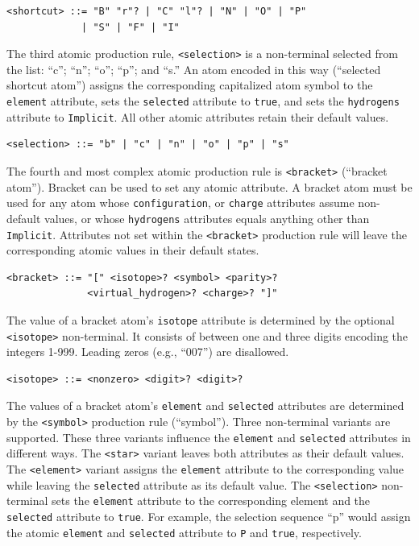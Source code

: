 \documentclass{article}
\def\ttt{\texttt}
\begin{document}
\begin{lstlisting}
<shortcut> ::= "B" "r"? | "C" "l"? | "N" | "O" | "P"
             | "S" | "F" | "I"
\end{lstlisting}

The third atomic production rule, \ttt{<selection>} is a non-terminal selected from the list: \enquote{c}; \enquote{n}; \enquote{o}; \enquote{p}; and \enquote{s.} An atom encoded in this way (\enquote{selected shortcut atom}) assigns the corresponding capitalized atom symbol to the \ttt{element} attribute, sets the \ttt{selected} attribute to \ttt{true}, and sets the \ttt{hydrogens} attribute to \ttt{Implicit}. All other atomic attributes retain their default values.

\begin{lstlisting}
<selection> ::= "b" | "c" | "n" | "o" | "p" | "s"
\end{lstlisting}

The fourth and most complex atomic production rule is \ttt{<bracket>} (\enquote{bracket atom}). Bracket can be used to set any atomic attribute. A bracket atom must be used for any atom whose \ttt{configuration}, or \ttt{charge} attributes assume non-default values, or whose \ttt{hydrogens} attributes equals anything other than \ttt{Implicit}. Attributes not set within the \ttt{<bracket>} production rule will leave the corresponding atomic values in their default states.

\begin{lstlisting}
<bracket> ::= "[" <isotope>? <symbol> <parity>?
              <virtual_hydrogen>? <charge>? "]"
\end{lstlisting}

The value of a bracket atom's \ttt{isotope} attribute is determined by the optional \ttt{<isotope>} non-terminal. It consists of between one and three digits encoding the integers 1-999. Leading zeros (e.g., \enquote{007}) are disallowed.

\begin{lstlisting}
<isotope> ::= <nonzero> <digit>? <digit>?
\end{lstlisting}

The values of a bracket atom's \ttt{element} and \ttt{selected} attributes are determined by the \ttt{<symbol>} production rule (\enquote{symbol}). Three non-terminal variants are supported. These three variants influence the \ttt{element} and \ttt{selected} attributes in different ways. The \ttt{<star>} variant leaves both attributes as their default values. The \ttt{<element>} variant assigns the \ttt{element} attribute to the corresponding value while leaving the \ttt{selected} attribute as its default value. The \ttt{<selection>} non-terminal sets the \ttt{element} attribute to the corresponding element and the \ttt{selected} attribute to \ttt{true}. For example, the selection sequence \enquote{p} would assign the atomic \ttt{element} and \ttt{selected} attribute to \ttt{P} and \ttt{true}, respectively.
\end{document}

